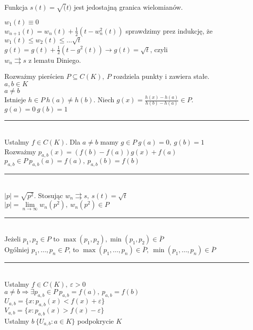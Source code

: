 \begin{lem} 
    Funkcja $s(t) = \sqrt(t)$ jest jedostajną granica wielomianów.
    \begin{dd} 
        $w_1(t) \equiv 0$ \\ 
        $w_{n+1} (t) = w_n (t) + \frac{1}{2} (t - w_n^2 (t))$ sprawdzimy prez indukcję, 
        że $w_1(t) \le w_2(t) \le \ldots \sqrt t$ \\ 
        $g(t) = g(t) + \frac{1}{2} (t - g^2(t)) \to g(t) = \sqrt t$, czyli \\ 
        $w_n \rightrightarrows s$ z lematu Diniego. 
    \end{dd} 
\end{lem} 
Rozważmy pierścien $P \subseteq C(K),\ P$ rozdziela punkty i zawiera stałe. \\ 
$a, b \in K$ \\ 
$a \neq b$ \\ 
Istnieje $h \in P \ h(a) \neq h(b)$. Niech $g(x) = \frac{h(x) - h(a)}{h(b)-h(a)} \in P$. 
$g(a) = 0 \ g(b) = 1$ \\ 
\rule{2cm}{0.4pt} \\ 
Ustalmy $f \in C(K)$. Dla $ a \neq b$ mamy $g \in P \ g(a) = 0,\ g(b)=1$ \\ 
Rozważmy $p_{a,b} (x) = (f(b)-f(a))g(x) + f(a)$ \\ 
$p_{a,b} \in P \ p_{a,b} (a) = f(a), \ p_{a,b} (b) = f(b)$ \\ 
\rule{2cm}{0.4pt}\\ 
$|p|  = \sqrt{p^2}$. Stosując $w_n \rightrightarrows s,\ s(t) = \sqrt t$ \\ 
$|p| = \lim\limits_{n \to \infty} w_n(p^2),\ w_n(p^2) \in P$ \\ 
\rule{2cm}{0.4pt}\\ 
Jeżeli $p_1,p_2 \in P$ to $\max(p_1,p_2), \min(p_1,p_2) \in \overline P$ \\ 
Ogólniej $p_1,\ldots,p_n \in P$, to $\max(p_1,\ldots,p_n) \in \overline P, \ 
\min(p_1,\ldots,p_n) \in \overline P$ \\ 
\rule{2cm}{0.4pt}\\ 
Ustalmy $f \in C(K),\ \varepsilon > 0$ \\ 
$a \neq b \Rightarrow \exists p_{a,b} \in P \ p_{a,b} = f(a),\ p_{a,b} = f(b)$ \\ 
$U_{a,b} = \{x: p_{a,b} (x) < f(x)+\varepsilon \}$ \\ 
$V_{a,b} = \{x: p_{a,b} (x) > f(x)-\varepsilon \}$ \\ 
Ustalmy $b\ \{U_{a,b}: a \in K\}$ podpokrycie $K$ \\ 
